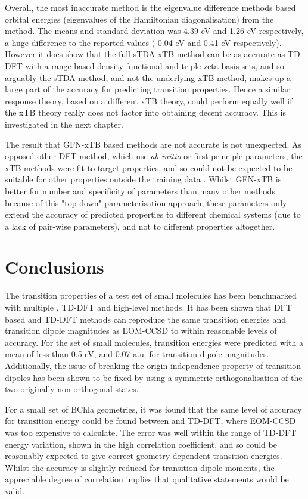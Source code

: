 Overall, the most inaccurate method is the eigenvalue difference methods based
orbital energies (eigenvalues of the Hamiltonian diagonalisation) from the 
method. The means and standard deviation was 4.39 eV and 1.26 eV respectively,
a huge difference to the reported values (-0.04 eV and 0.41 eV respectively)\cite{Grimme2016}. 
However it does show that the full sTDA-xTB method can be as accurate as TD-DFT
with a range-based density functional and triple zeta basis sets, and so arguably
the sTDA method, and not the underlying xTB method, makes up a large part of
the accuracy for predicting transition properties. Hence a similar response theory,
based on a different xTB theory, could perform equally well if the xTB theory really
does not factor into obtaining decent accuracy. This is investigated in the next
chapter.

The result that GFN-xTB based methods are not accurate is not unexpected. As opposed
other DFT method, which use \emph{ab initio} or first principle parameters, the
xTB methods were fit to target properties, and so could not be expected to be suitable
for other properties outside the training data \cite{Bannwarth2020}. Whilst GFN-xTB
is better for number and specificity of parameters than many other methods because 
of this "top-down" parameterisation approach, these parameters only extend the
accuracy of predicted properties to different chemical systems (due to a lack 
of pair-wise parameters), and not to different properties altogether.

\section{Conclusions}
The transition properties of a test set of small molecules has been benchmarked 
with multiple \dscf, TD-DFT and high-level methods. It has been shown that DFT 
based \dscf and TD-DFT methods can reproduce the same transition energies and 
transition dipole magnitudes as EOM-CCSD to within reasonable levels
of accuracy. For the set of small molecules, transition energies were predicted
with a mean of less than 0.5 eV, and 0.07 a.u. for transition dipole magnitudes.
Additionally, the issue of breaking the origin independence property of transition
dipoles has been shown to be fixed by using a symmetric orthogonalisation of the 
two originally non-orthogonal states.

For a small set of BChla geometries, it was found that the same level of accuracy
for transition energy could be found between \dscf and TD-DFT, where EOM-CCSD was
too expensive to calculate. The error was well within the range of TD-DFT energy
variation, shown in the high correlation coefficient, and so \dscf could be reasonably
expected to give correct geometry-dependent transition energies. Whilst the accuracy
is slightly reduced for transition dipole moments, the appreciable degree of correlation
implies that qualitative statements would be valid.

